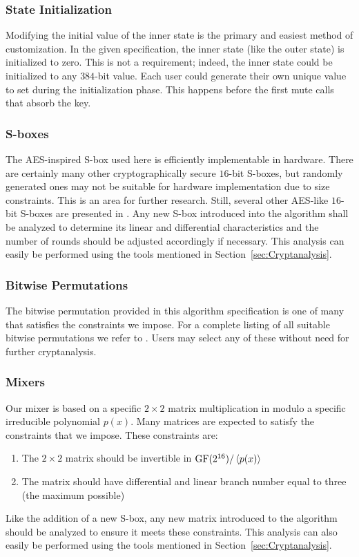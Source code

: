 \subsubsection{State Initialization}
Modifying the initial value of the inner state is the primary and easiest method of customization.
In the given specification, the inner state (like the outer state) is initialized to zero.
This is not a requirement; indeed, the inner state could be initialized to any $384$-bit value.
Each user could generate their own unique value to set during the initialization phase.
This happens before the first mute calls that absorb the key.

\subsubsection{S-boxes}
The AES-inspired S-box used here is efficiently implementable in hardware.
There are certainly many other cryptographically secure $16$-bit S-boxes, but randomly generated ones may not be suitable for hardware implementation due to size constraints.
This is an area for further research.
Still, several other AES-like $16$-bit S-boxes are presented in \cite{Wood2013_SboxThesis}.
Any new S-box introduced into the algorithm shall be analyzed to determine its linear and differential characteristics and the number of rounds should be adjusted accordingly if necessary.
This analysis can easily be performed using the tools mentioned in Section~\ref{sec:Cryptanalysis}.

\subsubsection{Bitwise Permutations}
The bitwise permutation provided in this algorithm specification is one of many that satisfies the constraints we impose.
For a complete listing of all suitable bitwise permutations we refer to \cite{Kelly2014_Thesis}.
Users may select any of these without need for further cryptanalysis.

\subsubsection{Mixers}
Our mixer is based on a specific $2 \times 2$ matrix multiplication in \gfsixteen modulo a specific irreducible polynomial $p(x)$.
Many matrices are expected to satisfy the constraints that we impose.
These constraints are:
\begin{enumerate}
\item The $2 \times 2$ matrix should be invertible in $\mathrm{GF}(2^{16}) /\left\langle p(x) \right\rangle$
\item The matrix should have differential and linear branch number equal to three (the maximum possible)
\end{enumerate}
Like the addition of a new S-box, any new matrix introduced to the algorithm should be analyzed to ensure it meets these constraints.
This analysis can also easily be performed using the tools mentioned in Section~\ref{sec:Cryptanalysis}.

